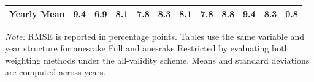 \begin{table}[!htbp]
{\begin{threeparttable}
\begin{tabular}{lccccccccccc}
\midrule
Yearly Mean & 9.4 & 6.9 & 8.1 & 7.8 & 8.3 & 8.1 & 7.8 & 8.8 & 9.4 & 8.3 & 0.8 \\
\bottomrule
\end{tabular}
\begin{tablenotes}
\footnotesize
\item \textit{Note:} RMSE is reported in percentage points. Tables use the same variable and year structure for anesrake Full and anesrake Restricted by evaluating both weighting methods under the all-validity scheme. Means and standard deviations are computed across years.
\end{tablenotes}
\end{threeparttable}%
}
\end{table}
